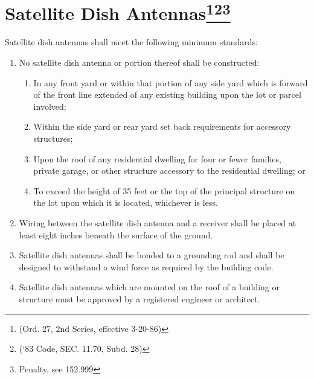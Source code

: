 \section{Satellite Dish Antennas\footnote{(Ord. 27, 2nd Series, effective 3-20-86)}\footnote{(‘83 Code, SEC. 11.70, Subd. 28)}\footnote{Penalty, see 152.999}}
Satellite dish antennas shall meet the following minimum standards:
\begin{enumerate}[{\indent}A)]
    \item No satellite dish antenna or portion thereof shall be constructed:
        \begin{enumerate}
            \item In any front yard or within that portion of any side yard which is forward of the front line extended of any existing building upon the lot or parcel involved;
            \item Within the side yard or rear yard set back requirements for accessory structures; 
            \item Upon the roof of any residential dwelling for four or fewer families, private garage, or other structure accessory to the residential dwelling; or 
            \item To exceed the height of 35 feet or the top of the principal structure on the lot upon which it is located, whichever is less.
        \end{enumerate}
    \item Wiring between the satellite dish antenna and a receiver shall be placed at least eight inches beneath the surface of the ground.
    \item Satellite dish antennas shall be bonded to a grounding rod and shall be designed to withstand a wind force as required by the building code.
    \item Satellite dish antennas which are mounted on the roof of a building or structure must be approved by a registered engineer or architect.
\end{enumerate}
